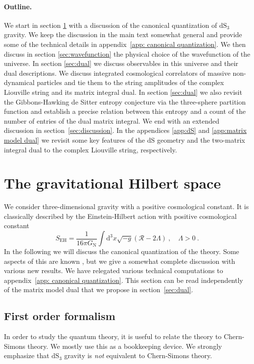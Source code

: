 \documentclass[12pt,a4paper]{article}
\renewcommand\d{\text{d}}
\begin{document}
\paragraph{Outline.}  We start in section \ref{sec:Hilbert space} with a discussion of the canonical quantization of $\text{dS}_3$ gravity. We keep the discussion in the main text somewhat general and provide some of the technical details in appendix~\ref{app: canonical quantization}. We then discuss in section \ref{sec:wavefunction} the physical choice of the wavefunction of the universe. In section \ref{sec:dual} we discuss observables in this universe and their dual descriptions. We discuss integrated cosmological correlators of massive non-dynamical particles and tie them to the string amplitudes of the complex Liouville string and its matrix integral dual. In section \ref{sec:dual} we also revisit the Gibbons-Hawking de Sitter entropy conjecture via the three-sphere partition function and establish a precise relation between this entropy and a count of the number of entries of the dual matrix integral.  We end with an extended discussion in section~\ref{sec:discussion}. In the appendices \ref{app:dS} and \ref{app:matrix model dual} we revisit some key features of the dS geometry and the two-matrix integral dual to the complex Liouville string, respectively.


\section{The gravitational Hilbert space}\label{sec:Hilbert space}
We consider three-dimensional gravity with a positive cosmological constant. It is classically described by the Einstein-Hilbert action with positive cosmological constant 
\begin{equation}
    S_{\mathrm{EH}} = \frac{1}{16 \pi G_{\text{N}} }\int \d^3 x \sqrt{-g} \left(\mathcal{R} -2\Lambda\right) ~,\quad \Lambda >0~.
\end{equation}
In the following we will discuss the canonical quantization of the theory. Some aspects of this are known \cite{Witten:1989ip, Cotler:2019nbi, Verlinde:2024zrh}, but we give a somewhat complete discussion with various new results. We have relegated various technical computations to appendix~\ref{app: canonical quantization}. This section can be read independently of the matrix model dual that we propose in section~\ref{sec:dual}.

\subsection{First order formalism} \label{subsec:relation CS}
In order to study the quantum theory, it is useful to relate the theory to Chern-Simons theory. We mostly use this as a bookkeeping device. We strongly emphasize that $\mathrm{dS}_3$ gravity is \emph{not} equivalent to Chern-Simons theory.
\end{document}
